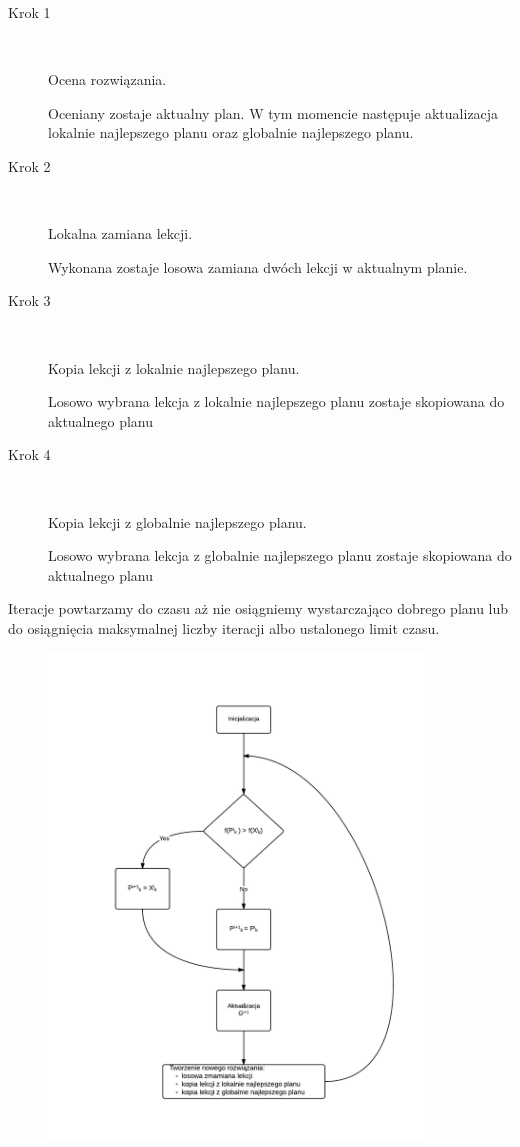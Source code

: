 \begin{description}
  \item[Krok 1] \hfill \\
     \par Ocena rozwiązania. \hfill \\
   \par Oceniany zostaje aktualny plan. W tym momencie następuje aktualizacja lokalnie najlepszego planu oraz globalnie najlepszego planu.
  \item[Krok 2] \hfill \\
     \par Lokalna zamiana lekcji. \hfill \\
    \par Wykonana zostaje losowa zamiana dwóch lekcji w aktualnym planie.

  \item[Krok 3] \hfill \\
      \par Kopia lekcji z lokalnie najlepszego planu. \hfill \\
        \par Losowo wybrana lekcja z lokalnie najlepszego planu zostaje skopiowana do aktualnego planu 
  \item[Krok 4] \hfill \\
      \par Kopia lekcji z globalnie najlepszego planu. \hfill \\
        \par Losowo wybrana lekcja z globalnie najlepszego planu zostaje skopiowana do aktualnego planu 
\end{description}
\par Iteracje powtarzamy do czasu aż nie osiągniemy wystarczająco dobrego planu lub do osiągnięcia maksymalnej liczby iteracji albo ustalonego limit czasu.
\begin{figure}[H]
\includegraphics[width=10cm]{img/schemat_pso.png}
\centering
\end{figure}
